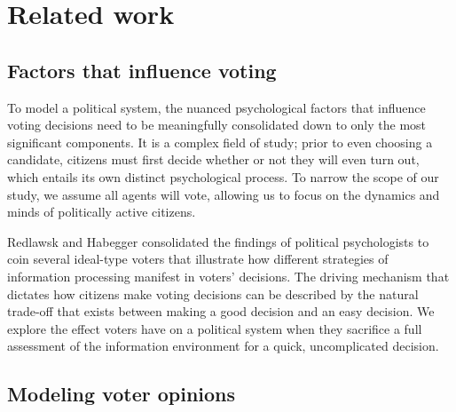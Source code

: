 \section{Related work}
\label{sec:related}


%

\subsection{Factors that influence voting}

To model a political system, the nuanced psychological factors that influence
voting decisions need to be meaningfully consolidated down to only the most
significant components. It is a complex field of study; prior to even choosing
a candidate, citizens must first decide whether or not they will even turn out,
which entails its own distinct psychological process. To narrow the scope of
our study, we assume all agents will vote, allowing us to focus on the dynamics
and minds of politically active citizens.

Redlawsk and Habegger\cite{redlawsk_citizens_2020} consolidated the findings
of political psychologists to coin several ideal-type voters that illustrate
how different strategies of information processing manifest in voters'
decisions. The driving mechanism that dictates how citizens make voting
decisions can be described by the natural trade-off that exists between making
a good decision and an easy decision. We explore the effect voters have on a
political system when they sacrifice a full assessment of the information
environment for a quick, uncomplicated decision. 


\subsection{Modeling voter opinions}

